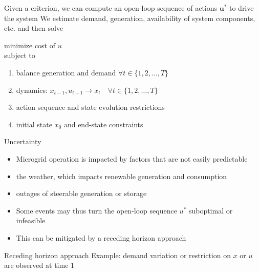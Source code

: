 \begin{frame}{Given a criterion, we can compute an open-loop sequence of actions $\boldsymbol{u}^{*}$ to drive the system }
We estimate demand, generation, availability of system components, etc. and then solve\\
\begin{center}
    \begin{minipage}{0.8\textwidth}
        
        minimize cost of $u$\\
        subject to 
        \begin{enumerate}
            \item  balance generation and demand \quad $\forall t \in\{1,2, \ldots, T\}$\\
            \item dynamics: $x_{t-1}, u_{t-1} \rightarrow x_{t} \quad \forall t \in\{1,2, \ldots, T\}$\\
            \item action sequence and state evolution restrictions\\
            \item initial state $x_{0}$ and end-state constraints
        \end{enumerate}
    \end{minipage}
\end{center}

\end{frame} \begin{frame}{Uncertainty}
\begin{itemize}
  \item Microgrid operation is impacted by factors that are not easily predictable
  \item the weather, which impacts renewable generation and consumption
  \item outages of steerable generation or storage
  \item Some events may thus turn the open-loop sequence $u^{*}$ suboptimal or infeasible
  \item This can be mitigated by a receding horizon approach
\end{itemize}

\end{frame} \begin{frame}{Receding horizon approach}
Example: demand variation or restriction on $x$ or $u$ are observed at time $1$ \\
\vspace{0.5cm}


\end{frame}
